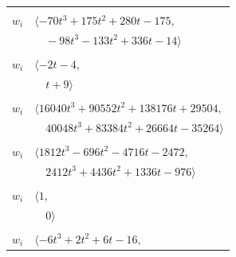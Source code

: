 \documentclass[11pt]{article}
\begin{document}
\begin{longtable}{@{}ll@{}}
\addlinespace[2pt]
\multicolumn{2}{@{}p{0.97\textwidth}@{}}{$i=24$, $D_i=1$, $\rho_{ij}$: $9{:}2, \allowbreak 16{:}1, \allowbreak 17{:}1, \allowbreak 18{:}2, \allowbreak 19{:}1, \allowbreak 32{:}1, \allowbreak 37{:}2, \allowbreak 44{:}2, \allowbreak 56{:}2, \allowbreak 60{:}1$}\\
$w_i$ & $\langle -70t^{3}+175t^{2}+280t-175,$\\
 & $\quad -98t^{3}-133t^{2}+336t-14\rangle$\\
\addlinespace[2pt]
\multicolumn{2}{@{}p{0.97\textwidth}@{}}{$i=25$, $D_i=1$, $\rho_{ij}$: $16{:}1, \allowbreak 21{:}1, \allowbreak 23{:}1, \allowbreak 60{:}2$}\\
$w_i$ & $\langle -2t-4,$\\
 & $\quad t+9\rangle$\\
\addlinespace[2pt]
\multicolumn{2}{@{}p{0.97\textwidth}@{}}{$i=26$, $D_i=1$, $\rho_{ij}$: $4{:}2, \allowbreak 6{:}1, \allowbreak 8{:}1, \allowbreak 14{:}2, \allowbreak 16{:}2, \allowbreak 38{:}2, \allowbreak 40{:}1, \allowbreak 47{:}1, \allowbreak 57{:}2, \allowbreak 59{:}2, \allowbreak 60{:}2, \allowbreak 68{:}1, \allowbreak 72{:}2, \allowbreak 97{:}2$}\\
$w_i$ & $\langle 16040t^{3}+90552t^{2}+138176t+29504,$\\
 & $\quad 40048t^{3}+83384t^{2}+26664t-35264\rangle$\\
\addlinespace[2pt]
\multicolumn{2}{@{}p{0.97\textwidth}@{}}{$i=27$, $D_i=1$, $\rho_{ij}$: $4{:}1, \allowbreak 9{:}2, \allowbreak 14{:}1, \allowbreak 17{:}1, \allowbreak 39{:}2, \allowbreak 61{:}1, \allowbreak 64{:}1, \allowbreak 65{:}2, \allowbreak 67{:}2, \allowbreak 72{:}1, \allowbreak 84{:}1, \allowbreak 89{:}2, \allowbreak 93{:}1, \allowbreak 95{:}1$}\\
$w_i$ & $\langle 1812t^{3}-696t^{2}-4716t-2472,$\\
 & $\quad 2412t^{3}+4436t^{2}+1336t-976\rangle$\\
\addlinespace[2pt]
\multicolumn{2}{@{}p{0.97\textwidth}@{}}{$i=28$, $D_i=1$, $\rho_{ij}$: $--$}\\
$w_i$ & $\langle 1,$\\
 & $\quad 0\rangle$\\
\addlinespace[2pt]
\multicolumn{2}{@{}p{0.97\textwidth}@{}}{$i=29$, $D_i=1$, $\rho_{ij}$: $3{:}1, \allowbreak 8{:}2, \allowbreak 19{:}1, \allowbreak 37{:}1, \allowbreak 38{:}2, \allowbreak 56{:}2, \allowbreak 61{:}1$}\\
$w_i$ & $\langle -6t^{3}+2t^{2}+6t-16,$\\

\end{longtable}
\end{document}
